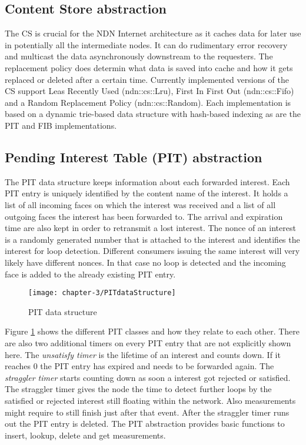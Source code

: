 \subsection{Content Store abstraction}

The CS is crucial for the NDN Internet architecture as it caches data for later use in potentially all the intermediate nodes. It can do rudimentary error recovery and multicast the data asynchronously downstream to the requesters. The replacement policy does determin what data is saved into cache and how it gets replaced or deleted after a certain time. Currently implemented versions of the CS support Leas Recently Used (ndn::cs::Lru), First In First Out (ndn::cs::Fifo) and a Random Replacement Policy (ndn::cs::Random). Each implementation is based on a dynamic trie-based data structure with hash-based indexing as are the PIT and FIB implementations.

\subsection{Pending Interest Table (PIT) abstraction}

The PIT data structure keeps information about each forwarded interest. Each PIT entry is uniquely identified by the content name of the interest. It holds a list of all incoming faces on which the interest was received and a list of all outgoing faces the interest has been forwarded to. The arrival and expiration time are also kept in order to retransmit a lost interest. The nonce of an interest is a randomly generated number that is attached to the interest and identifies the interest for loop detection. Different consumers issuing the same interest will very likely have different nonces. In that case no loop is detected and the incoming face is added to the already existing PIT entry.

\begin{figure}[H]
  \centering
  \texttt{[image: chapter-3/PITdataStructure]}
  \caption{PIT data structure}
  \label{fig:PITdataStructure}
\end{figure}

Figure \ref{fig:PITdataStructure} shows the different PIT classes and how they relate to each other. There are also two additional timers on every PIT entry that are not explicitly shown here. The \emph{unsatisfy timer} is the lifetime of an interest and counts down. If it reaches 0 the PIT entry has expired and needs to be forwarded again. The \emph{straggler timer} starts counting down as soon a interest got rejected or satisfied. The straggler timer gives the node the time to detect further loops by the satisfied or rejected interest still floating within the network. Also measurements might require to still finish just after that event. After the straggler timer runs out the PIT entry is deleted. The PIT abstraction provides basic functions to insert, lookup, delete and get measurements.

